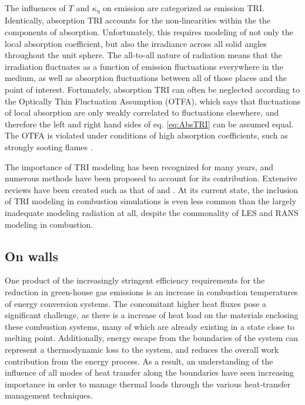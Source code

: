 The influences of $T$ and $\kappa{}_\eta{}$ on emission are categorized as emission TRI. Identically, absorption TRI accounts for the non-linearities within the the components of absorption. Unfortunately, this requires modeling of not only the local absorption coefficient, but also the irradiance across all solid angles throughout the unit sphere.
The all-to-all nature of radiation means that the irradiation fluctuates as a function of emission fluctuations everywhere in the medium, as well as absorption fluctuations between all of those places and the point of interest. Fortunately, absorption TRI can often be neglected according to the Optically Thin Fluctuation Assumption (OTFA), which says that fluctuations of local absorption are only weakly correlated to fluctuations elsewhere, and therefore the left and right hand sides of eq. \ref{eq:AbsTRI} can be assumed equal.
The OTFA is violated under conditions of high absorption coefficients, such as strongly sooting flames \cite{Modest2016RadiativeSystems}.

The importance of TRI modeling has been recognized for many years, and numerous methods have been proposed to account for its contribution. Extensive reviews have been created such as that of \citet{Modest2016RadiativeSystems} and \citet{Coelho2018RadiativeSystems}. 
At its current state, the inclusion of TRI modeling in combustion simulations is even less common than the largely inadequate modeling radiation at all, despite the commonality of LES and RANS modeling in combustion.

\subsection{On walls}
One product of the increasingly stringent efficiency requirements for the reduction in green-house gas emissions is an increase in combustion temperatures of energy conversion systems. 
The concomitant higher heat fluxes pose a significant challenge, as there is a increase of heat load on the materials enclosing these combustion systems, many of which are already existing in a state close to melting point. 
Additionally, energy escape from the boundaries of the system can represent a thermodynamic loss to the system, and reduces the overall work contribution from the energy process.
As a result, an understanding of the influence of all modes of heat transfer along the boundaries have seen increasing importance in order to manage thermal loads through the various heat-transfer management techniques.


